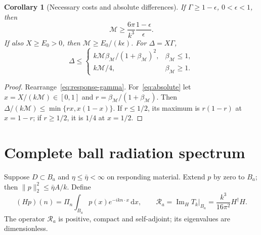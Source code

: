 \documentclass[11pt]{article}
\newtheorem{corollary}[theorem]{Corollary}
\newcommand{\ImH}{\operatorname{Im}_{\!H}}
\newcommand{\dd}{\,\mathrm{d}}
\newcommand{\norm}[1]{\lVert #1\rVert}
\begin{document}
\begin{corollary}[Necessary costs and absolute differences]\label{cor:costs}
If $\Gamma\geq1-\epsilon$, $0<\epsilon<1$, then
\begin{equation}\label{eq:costs}
 \mathcal M\geq\frac{6\pi}{k^3}\frac{1-\epsilon}{\epsilon}.
\end{equation}
If also $X\geq E_0>0$, then $\mathcal M\geq E_0/(k\epsilon)$. For $\Delta=X\Gamma$,
\begin{equation}\label{eq:absolute}
 \Delta\leq
 \begin{cases}
 k\mathcal M\beta_{\mathcal M}/(1+\beta_{\mathcal M})^2,&\beta_{\mathcal M}\leq1,\\
 k\mathcal M/4,&\beta_{\mathcal M}\geq1.
 \end{cases}
\end{equation}
\end{corollary}
\begin{proof}
Rearrange~\eqref{eq:response-gamma}. For~\eqref{eq:absolute} let $x=X/(k\mathcal M)\in[0,1]$ and $r=\beta_{\mathcal M}/(1+\beta_{\mathcal M})$. Then $\Delta/(k\mathcal M)\leq\min\{rx,x(1-x)\}$. If $r\leq1/2$, its maximum is $r(1-r)$ at $x=1-r$; if $r\geq1/2$, it is $1/4$ at $x=1/2$.
\end{proof}

\section{Complete ball radiation spectrum}\label{sec:spectrum}
Suppose $D\subset B_a$ and $\eta\leq\bar\eta<\infty$ on responding material. Extend $p$ by zero to $B_a$; then $\norm p_2^2\leq\bar\eta A/k$. Define
\begin{equation}\label{eq:angular-operator}
 (Hp)(n)=\Pi_n\int_{B_a}p(x)e^{-ikn\cdot x}\dd x,\qquad
 \mathcal R_a=\ImH T_k\big|_{B_a}=\frac{k^3}{16\pi^2}H^\dagger H.
\end{equation}
The operator $\mathcal R_a$ is positive, compact and self-adjoint; its eigenvalues are dimensionless.
\end{document}
